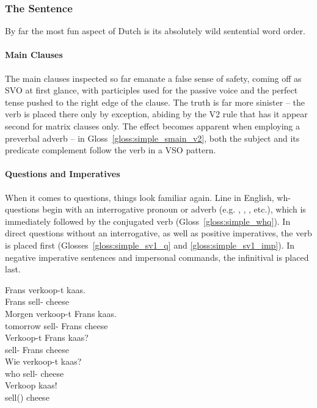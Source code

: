 \subsubsection{The Sentence}
By far the most fun aspect of Dutch is its absolutely wild sentential word order.

\paragraph{Main Clauses}
The main clauses inspected so far emanate a false sense of safety, coming off as SVO at first glance, with participles used for the passive voice and the perfect tense pushed to the right edge of the clause.
The truth is far more sinister -- the verb is placed there only by exception, abiding by the V2 rule that has it appear second for matrix clauses only.
The effect becomes apparent when employing a preverbal adverb -- in Gloss~\ref{gloss:simple_smain_v2}, both the subject and its predicate complement follow the verb in a VSO pattern.

\paragraph{Questions and Imperatives}
When it comes to questions, things look familiar again.
Line in English, wh-questions begin with an interrogative pronoun or adverb (e.g. , , ,  etc.), which is immediately followed by the conjugated verb (Gloss~\ref{gloss:simple_whq}).
In direct questions without an interrogative, as well as positive imperatives, the verb is placed first (Glosses~\ref{gloss:simple_sv1_q} and \ref{gloss:simple_sv1_imp}).
In negative imperative sentences and impersonal commands, the infinitival is placed last.

\begin{exe}
\ex
\begin{xlist}
\ex\label{gloss:simple_smain}
\gll Frans verkoop-t kaas.\\
Frans sell- cheese\\
\ex\label{gloss:simple_smain_v2}
\gll Morgen verkoop-t Frans kaas.\\
tomorrow sell- Frans cheese\\
\ex\label{gloss:simple_sv1_q}
\gll Verkoop-t Frans kaas?\\
sell- Frans cheese\\
\ex\label{gloss:simple_whq}
\gll Wie verkoop-t kaas?\\
who sell- cheese\\
\ex\label{gloss:simple_sv1_imp}
\gll Verkoop kaas!\\
sell() cheese\\
\end{xlist}
\end{exe}


